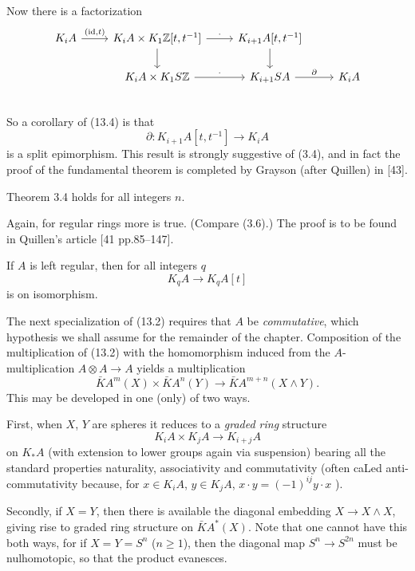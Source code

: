 Now there is a factorization
\[
 \begin{tikzcd}
 K_iA \arrow{r}{(\id,t)} & K_iA\times K_1 \mathbb{Z}[t,t^{-1}] \arrow[r,"\cdot"] \arrow[d] & K_{i+1}A[t,t^{-1}] \arrow[d]& \\
  &K_iA\times K_1 S\mathbb{Z} \arrow[r,"\cdot"] &K_{i+1}SA \arrow[r,"\partial"] &K_iA \\
 \end{tikzcd}
 \]
So a corollary of (13.4) is that
\[\partial \colon K_{i+1}A[t,t^{-1}] \longrightarrow K_iA\]
is a split epimorphism. This result is strongly suggestive of (3.4), and in fact the proof of the
fundamental theorem is completed by Grayson (after Quillen) in [43].
\begin{theorem}
Theorem 3.4 holds for all integers $n$.
\end{theorem}
Again, for regular rings more is true. (Compare (3.6).) The proof is to be found in Quillen's article [41 pp.85--147].

\begin{prop}
  If $A$ is left regular, then for all integers $q$
\[K_qA \longrightarrow K_qA[t]\]
is on isomorphism.
 \end{prop} 

The next specialization of (13.2) requires that $A$ be {\em commutative}, which hypothesis we shall assume for the remainder of the chapter. Composition of the multiplication of (13.2) with the homomorphism induced from the $A$-multiplication $A \otimes A \longrightarrow A$ yields a multiplication
\[\bar{K}A^m(X) \times \bar{K}A^n(Y) \longrightarrow \bar{K}A^{m+n}(X \wedge Y).\]
This may be developed in one (only) of two ways.

First, when $X$, $Y$ are spheres it reduces to a {\em graded ring} structure
\[K_iA \times K_jA \longrightarrow K_{i+j}A\]
on $K_*A$ (with extension to lower groups again via suspension) bearing all the standard properties naturality, associativity and commutativity (often caLed anti-commutativity because, for $x\in K_iA$, $y \in K_jA$, $x \cdot y = (-1)^{ij} y\cdot x$ ).

Secondly, if $X = Y$, then there is available the diagonal embedding $X \longrightarrow X \wedge X$, giving rise to graded ring structure on $\bar{K}A^*(X)$. Note that one cannot have this both ways, for if $X = Y = S^n$ ($n\geqslant 1$), then the diagonal map $S^n \longrightarrow S^{2n}$ must be nulhomotopic, so that the product evanesces.

